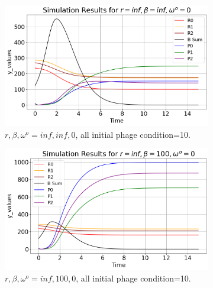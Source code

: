 \begin{figure}[]
    \centering
    \begin{subfigure}{0.32\linewidth}
        \centering
        \includegraphics[width=\linewidth]{Images/Plots/Created/UA/r_beta_washout_inf_inf_0.png}
        \caption{
            $r, \beta, \omega^o = inf, inf, 0$, all initial phage condition=10. 
        }
        \label{fig:created:r_beta_washout_inf_inf_0}
    \end{subfigure}
    \begin{subfigure}{0.32\linewidth}
        \centering
        \includegraphics[width=\linewidth]{Images/Plots/Created/UA/r_beta_washout_inf_100_0.png}
        \caption{
            $r, \beta, \omega^o = inf, 100, 0$, all initial phage condition=10. 
        }
        \label{fig:created:r_beta_washout_inf_100_0}
    \end{subfigure}
    \begin{subfigure}{0.32\linewidth}
        \centering

\end{subfigure}
\end{figure}

